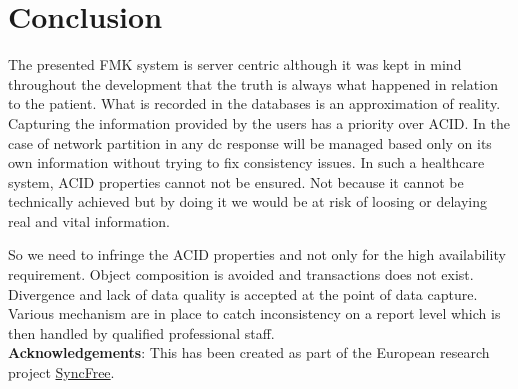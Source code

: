 \documentclass[english]{article}
\begin{document}
\section{Conclusion}

The presented FMK system is server centric although it was kept in mind throughout the development that the truth is always what happened in relation to the patient. What is recorded in the databases is an approximation of reality. Capturing the information provided by the users has a priority over ACID. In the case of network partition in any \gls{dc} response will be managed based only on its own information without trying to fix consistency issues. In such a healthcare system, ACID properties cannot not be ensured. Not because it cannot be technically achieved but by doing it we would be at risk of loosing or delaying real and vital information.

So we need to infringe the ACID properties and not only for the high availability requirement.  Object composition is avoided and transactions does not exist. Divergence and lack of data quality is accepted at the point of data capture.  Various mechanism are in place to catch inconsistency on a report level which is then handled by qualified professional staff.\\

{\bf Acknowledgements}: 
This has been created as part of the European research project \href{https://syncfree.lip6.fr}{SyncFree}.



\end{document}
